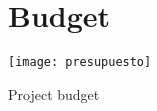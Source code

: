 \chapter{Budget}	
\begin{table}
\centering
\texttt{[image: presupuesto]} 
\caption{\label{tab:costs}Project budget}
\end{table}